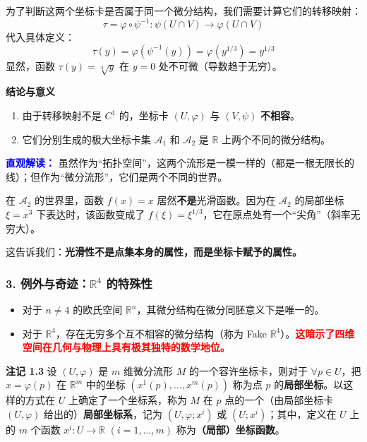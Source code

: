 \begin{myremark}
为了判断这两个坐标卡是否属于同一个微分结构，我们需要计算它们的转移映射：
$$
\tau = \varphi \circ \psi^{-1} : \psi(U \cap V) \to \varphi(U \cap V)
$$
代入具体定义：
$$
\tau(y) = \varphi(\psi^{-1}(y)) = \varphi(y^{1/3}) = y^{1/3}
$$
显然，函数 $\tau(y) = \sqrt[3]{y}$ 在 $y=0$ 处不可微（导数趋于无穷）。

{\bf  结论与意义}

\begin{enumerate}
    \item 由于转移映射不是 $C^1$ 的，坐标卡 $(U, \varphi)$ 与 $(V, \psi)$ \textbf{不相容}。
    \item 它们分别生成的极大坐标卡集 $\mathcal{A}_1$ 和 $\mathcal{A}_2$ 是 $\mathbb{R}$ 上两个不同的微分结构。
\end{enumerate}

\textbf{\textcolor{blue}{直观解读：}}
虽然作为“拓扑空间”，这两个流形是一模一样的（都是一根无限长的线）；但作为“微分流形”，它们是两个不同的世界。

在 $\mathcal{A}_2$ 的世界里，函数 $f(x) = x$ 居然\textbf{不是}光滑函数。因为在 $\mathcal{A}_2$ 的局部坐标 $\xi = x^3$ 下表达时，该函数变成了 $f(\xi) = \xi^{1/3}$，它在原点处有一个“尖角”（斜率无穷大）。

这告诉我们：\textbf{光滑性不是点集本身的属性，而是坐标卡赋予的属性。}

\subsubsection*{3. 例外与奇迹：$\mathbb{R}^4$ 的特殊性}

\begin{itemize}
    \item 对于 $n \neq 4$ 的欧氏空间 $\mathbb{R}^n$，其微分结构在微分同胚意义下是唯一的。
    \item 对于 $\mathbb{R}^4$，存在无穷多个互不相容的微分结构（称为 Fake $\mathbb{R}^4$）。\textcolor{red}{\bf 这暗示了四维空间在几何与物理上具有极其独特的数学地位。}
\end{itemize}
\end{myremark}

{\bf 注记 1.3}  设  $(U, \varphi)$  是  $m$  维微分流形  $M$  的一个容许坐标卡，则对于  $\forall p \in U$，把  $x = \varphi(p)$  在  $\mathbb{R}^m$  中的坐标  $(x^1(p), \dots, x^m(p))$  称为点  $p$  的{\bf 局部坐标}。以这样的方式在  $U$  上确定了一个坐标系，称为  $M$  在  $p$  点的一个（由局部坐标卡  $(U, \varphi)$  给出的）{\bf 局部坐标系}，记为  $(U, \varphi; x^i)$  或  $(U; x^i)$；其中，定义在  $U$  上的  $m$  个函数  $x^i: U \to \mathbb{R}$ $(i = 1, \dots, m)$  称为{\bf（局部）坐标函数}。

